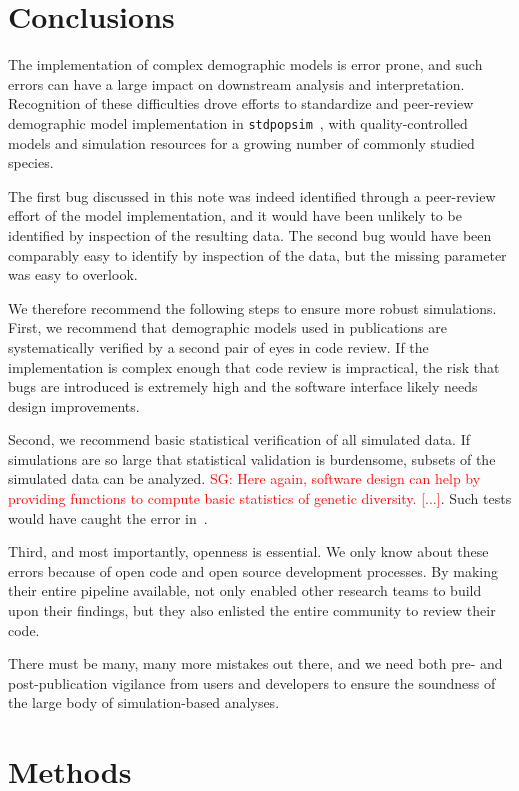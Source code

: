 \documentclass{article}
\newcommand{\stdpopsim}[0]{\texttt{stdpopsim}}
\newcommand{\sgcomment}[1]{{\textcolor{red}{SG: #1}}}
\begin{document}
\section{Conclusions}

The implementation of complex demographic models is error prone, and such errors can 
have a large impact on downstream analysis and interpretation. 
Recognition of these difficulties drove efforts to standardize and peer-review demographic model
implementation in \stdpopsim~\citep{adrion2019community}, with quality-controlled
models and simulation resources for a growing number of commonly studied species. 

The first bug discussed in this note was indeed identified through a peer-review effort of the 
model implementation,  and it would have been unlikely to be identified by inspection of the 
resulting data. The second bug would have been comparably easy to identify by inspection of the data, 
but the missing parameter was easy to overlook. 

We therefore recommend the following steps to ensure more robust simulations.
First, we recommend that demographic models used in publications 
are systematically verified by a second pair of eyes in code review. If the implementation is complex enough
that code review is impractical, the risk that bugs are introduced is extremely high and the software 
interface likely needs design improvements. 

Second, we recommend basic statistical verification of all simulated data. If simulations are so large that
statistical validation is burdensome, subsets of the simulated data can be analyzed. 
\sgcomment{Here again, software design can help by providing functions to compute 
basic statistics of genetic diversity. [...]}. Such tests would have caught the error in~\citet{martin2017human}.


Third, and most importantly, openness is essential. We only know about these errors because of open code and
open source development processes. By making their entire pipeline available, \citet{martin2017human} not only 
enabled other research teams to build upon their findings, but they also enlisted the entire community to review their code. 

There must be many, many more mistakes out there, and we need both pre- and post-publication vigilance from 
users and developers to ensure the soundness of the large body of simulation-based analyses. 


\section{Methods}
\end{document}

